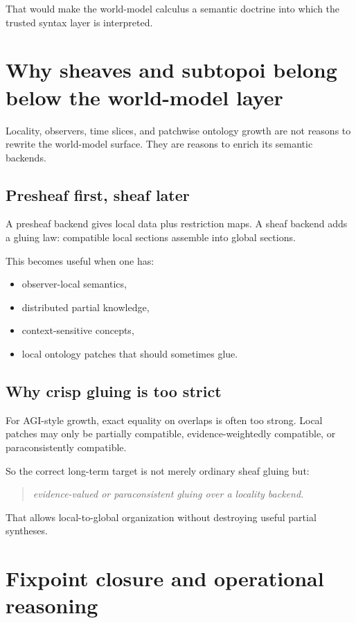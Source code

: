 \documentclass[11pt]{article}
\begin{document}
That would make the world-model calculus a semantic doctrine into which the
trusted syntax layer is interpreted.

\section{Why sheaves and subtopoi belong below the world-model layer}

Locality, observers, time slices, and patchwise ontology growth are not reasons
to rewrite the world-model surface.  They are reasons to enrich its semantic
backends.

\subsection{Presheaf first, sheaf later}

A presheaf backend gives local data plus restriction maps.  A sheaf backend adds
a gluing law: compatible local sections assemble into global sections.

This becomes useful when one has:
\begin{itemize}
  \item observer-local semantics,
  \item distributed partial knowledge,
  \item context-sensitive concepts,
  \item local ontology patches that should sometimes glue.
\end{itemize}

\subsection{Why crisp gluing is too strict}

For AGI-style growth, exact equality on overlaps is often too strong.  Local
patches may only be partially compatible, evidence-weightedly compatible, or
paraconsistently compatible.

So the correct long-term target is not merely ordinary sheaf gluing but:
\begin{quote}
\emph{evidence-valued or paraconsistent gluing over a locality backend.}
\end{quote}

That allows local-to-global organization without destroying useful partial
syntheses.

\section{Fixpoint closure and operational reasoning}
\end{document}
